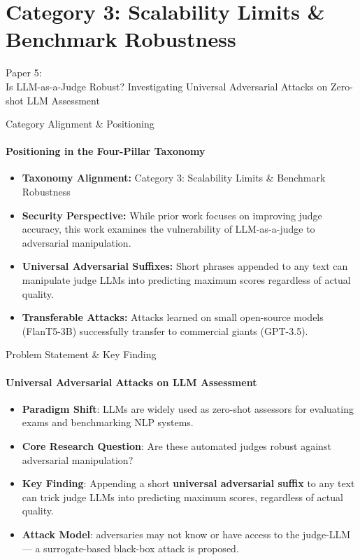 \documentclass[10pt]{beamer}
\begin{document}
	\section{Category 3: Scalability Limits \& Benchmark Robustness}
	\begin{frame}[standout]
		\hypertarget{paper5}{}
		\Large Paper 5:\\Is LLM-as-a-Judge Robust? Investigating Universal Adversarial Attacks on Zero-shot LLM Assessment
	\end{frame}
	
	
	\begin{frame}{Category Alignment \& Positioning}
		\framesubtitle{Positioning in the Four-Pillar Taxonomy}
		\begin{itemize}
			\item \textbf{Taxonomy Alignment:} Category 3: Scalability Limits \& Benchmark Robustness
			\item \textbf{Security Perspective:} While prior work focuses on improving judge accuracy, this work examines the vulnerability of LLM-as-a-judge to adversarial manipulation.
			\item \textbf{Universal Adversarial Suffixes:} Short phrases appended to any text can manipulate judge LLMs into predicting maximum scores regardless of actual quality.
			\item \textbf{Transferable Attacks:} Attacks learned on small open-source models (FlanT5-3B) successfully transfer to commercial giants (GPT-3.5).
		\end{itemize}
	\end{frame}
	
	\begin{frame}{Problem Statement \& Key Finding}
		\framesubtitle{Universal Adversarial Attacks on LLM Assessment}
		\begin{itemize}
			\item \textbf{Paradigm Shift}: LLMs are widely used as zero-shot assessors for evaluating exams and benchmarking NLP systems.
			\vspace{0.2cm}
			\item \textbf{Core Research Question}: Are these automated judges robust against adversarial manipulation?
			\vspace{0.2cm}
			\item \textbf{Key Finding}: Appending a short \textbf{universal adversarial suffix} to any text can trick judge LLMs into predicting maximum scores, regardless of actual quality.
			\vspace{0.2cm}
			\item \textbf{Attack Model}: adversaries may not know or have access to the judge-LLM --- a surrogate-based black-box attack is proposed.
		\end{itemize}
	\end{frame}
	
\end{document}
